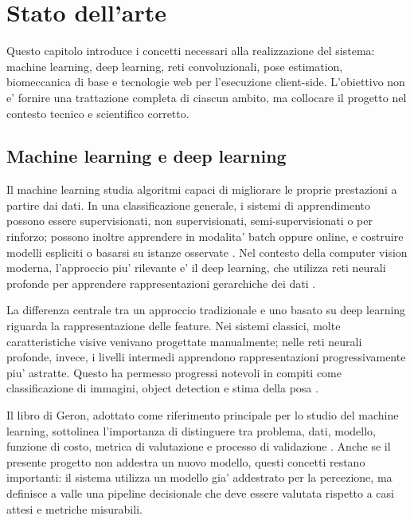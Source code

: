
\chapter{Stato dell'arte}
\label{ch:state}

Questo capitolo introduce i concetti necessari alla realizzazione del sistema: machine learning, deep learning, reti convoluzionali, pose estimation, biomeccanica di base e tecnologie web per l'esecuzione client-side. L'obiettivo non e' fornire una trattazione completa di ciascun ambito, ma collocare il progetto nel contesto tecnico e scientifico corretto.

\section{Machine learning e deep learning}

Il machine learning studia algoritmi capaci di migliorare le proprie prestazioni a partire dai dati. In una classificazione generale, i sistemi di apprendimento possono essere supervisionati, non supervisionati, semi-supervisionati o per rinforzo; possono inoltre apprendere in modalita' batch oppure online, e costruire modelli espliciti o basarsi su istanze osservate \cite{geron2019hands}. Nel contesto della computer vision moderna, l'approccio piu' rilevante e' il deep learning, che utilizza reti neurali profonde per apprendere rappresentazioni gerarchiche dei dati \cite{goodfellow2016deep,lecun2015deep}.

La differenza centrale tra un approccio tradizionale e uno basato su deep learning riguarda la rappresentazione delle feature. Nei sistemi classici, molte caratteristiche visive venivano progettate manualmente; nelle reti neurali profonde, invece, i livelli intermedi apprendono rappresentazioni progressivamente piu' astratte. Questo ha permesso progressi notevoli in compiti come classificazione di immagini, object detection e stima della posa \cite{krizhevsky2012imagenet,he2016resnet}.

Il libro di Geron, adottato come riferimento principale per lo studio del machine learning, sottolinea l'importanza di distinguere tra problema, dati, modello, funzione di costo, metrica di valutazione e processo di validazione \cite{geron2019hands}. Anche se il presente progetto non addestra un nuovo modello, questi concetti restano importanti: il sistema utilizza un modello gia' addestrato per la percezione, ma definisce a valle una pipeline decisionale che deve essere valutata rispetto a casi attesi e metriche misurabili.

